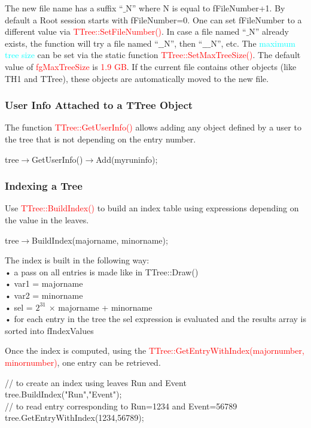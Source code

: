 \documentclass[12pt,a4paper]{article}
\begin{document}
The new file name has a suffix ``$\_$N” where N is equal to fFileNumber+1. By default a Root session starts with fFileNumber=0. One can set fFileNumber to a different value via \textcolor{red}{TTree::SetFileNumber()}. In case a file named ``$\_$N” already exists, the function will try a file named ``$\_\_$N”, then ``$\_\_\_$N”, etc. The \textcolor{cyan}{maximum tree size} can be set via the static function \textcolor{red}{TTree::SetMaxTreeSize()}. The default value of \textcolor{red}{fgMaxTreeSize} is \textcolor{red}{1.9 GB}. If the current file contains other objects (like TH1 and TTree), these objects are automatically moved to the new file.

\subsubsection{User Info Attached to a TTree Object}
The function \textcolor{red}{TTree::GetUserInfo()} allows adding any object defined by a user to the tree that is not depending on the entry number. 

tree$\rightarrow$GetUserInfo()$\rightarrow$Add(myruninfo);

\subsubsection{Indexing a Tree}
Use \textcolor{red}{TTree::BuildIndex()} to build an index table using expressions depending on the value in the leaves.

tree$\rightarrow$BuildIndex(majorname, minorname);

The index is built in the following way: \\
• a pass on all entries is made like in TTree::Draw() \\
• var1 = majorname \\
• var2 = minorname \\
• sel = $2^{31}$ $\times$ majorname + minorname \\
• for each entry in the tree the sel expression is evaluated and the results array is sorted into fIndexValues

Once the index is computed, using the \textcolor{red}{TTree::GetEntryWithIndex(majornumber, minornumber)}, one entry can be retrieved.

// to create an index using leaves Run and Event \\
tree.BuildIndex("Run","Event"); \\
// to read entry corresponding to Run=1234 and Event=56789 \\
tree.GetEntryWithIndex(1234,56789); 
\end{document}

